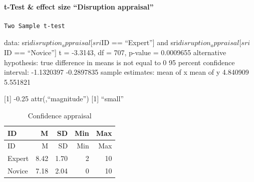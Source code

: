 \documentclass[
]{article}
\begin{document}
\paragraph{t-Test \& effect size ``Disruption
appraisal''}\label{t-test-effect-size-disruption-appraisal}

\begin{verbatim}
Two Sample t-test
\end{verbatim}

data: sri\(disruption_appraisal[sri\)ID == ``Expert''{]} and
sri\(disruption_appraisal[sri\)ID == ``Novice''{]} t = -3.3143, df =
707, p-value = 0.0009655 alternative hypothesis: true difference in
means is not equal to 0 95 percent confidence interval: -1.1320397
-0.2897835 sample estimates: mean of x mean of y 4.840909 5.551821

{[}1{]} -0.25 attr(,``magnitude'') {[}1{]} ``small''

\begin{longtable}[]{@{}lrrrr@{}}
\caption{Confidence appraisal}\tabularnewline
\toprule\noalign{}
ID & M & SD & Min & Max \\
\midrule\noalign{}
\endfirsthead
\toprule\noalign{}
ID & M & SD & Min & Max \\
\midrule\noalign{}
\endhead
\bottomrule\noalign{}
\endlastfoot
Expert & 8.42 & 1.70 & 2 & 10 \\
Novice & 7.18 & 2.04 & 0 & 10 \\
\end{longtable}
\end{document}
